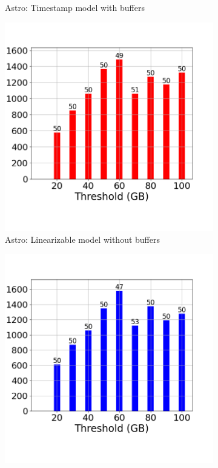 \begin{figure}
\begin{subfigure}[c]{0.48\textwidth}
		\caption{Astro: Timestamp model with buffers}
		\label{fig:system-ts-70-astro}
	\end{subfigure}
	\begin{subfigure}[c]{0.48\textwidth}
		\includegraphics[width=1\textwidth]	 {figures/Experiments/Dynamic/ASTRO/Batch_processing/70/average_query_time_per_batch_version_999777016_10485760_10_delay[70].png}
		\caption{Astro: Linearizable model without buffers}
		\label{fig:logical-ts-no-70-astro}
	\end{subfigure}
	\begin{subfigure}[c]{0.48\textwidth}
		\includegraphics[width=1\textwidth]	 {figures/Experiments/Dynamic/ASTRO/Batch_processing/70/average_query_time_per_batch_version_999777017_10485760_10_delay[70].png}

\end{subfigure}
\end{figure}
